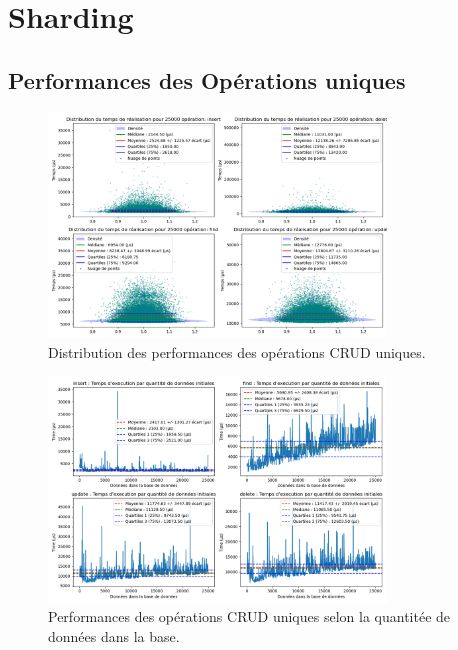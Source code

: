 \documentclass[12pt,a4paper]{report}
\begin{document}
\section{Sharding}
    
    \subsection{Performances des Opérations uniques}

        \begin{figure}[H]
            \centering
            \includegraphics[width=0.8\textwidth]{../plots/MongoDB/sharding/global_test_one.png}
            \caption{Distribution des performances des opérations CRUD uniques.}
            \label{fig:mongo_sharded_global_one}
        \end{figure}

        \begin{figure}[H]
            \centering
            \includegraphics[width=0.8\textwidth]{../plots/MongoDB/sharding/test_one_various_data.png}
            \caption{Performances des opérations CRUD uniques selon la quantitée de données dans la base.}
            \label{fig:mongo_sharded_one_various}
        \end{figure}
\end{document}
